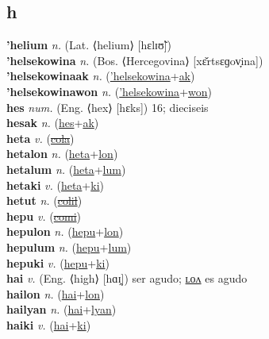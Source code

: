 \subsection{h}

\textbf{'helium} \textit{n.} (Lat. ⟨helium⟩ [hɛlɪʊ̃])
 \label{'helium} \\
\textbf{'helsekowina} \textit{n.} (Bos. ⟨Hercegovina⟩ [xɛ̌rtsɛɡov̞ina])
 \label{'helsekowina} \\
\textbf{'helsekowinaak} \textit{n.} (\hyperref['helsekowina]{'helsekowina}+\hyperref[ak]{ak})
 \label{'helsekowinaak} \\
\textbf{'helsekowinawon} \textit{n.} (\hyperref['helsekowina]{'helsekowina}+\hyperref[won]{won})
 \label{'helsekowinawon} \\
\textbf{hes} \textit{num.} (Eng. ⟨hex⟩ [hɛks])
16; dieciseis \label{hes} \\
\textbf{hesak} \textit{n.} (\hyperref[hes]{hes}+\hyperref[ak]{ak})
 \label{hesak} \\
\textbf{heta} \textit{v.} (\hyperref[cola]{\sout{cola}})
 \label{heta} \\
\textbf{hetalon} \textit{n.} (\hyperref[heta]{heta}+\hyperref[lon]{lon})
 \label{hetalon} \\
\textbf{hetalum} \textit{n.} (\hyperref[heta]{heta}+\hyperref[lum]{lum})
 \label{hetalum} \\
\textbf{hetaki} \textit{v.} (\hyperref[heta]{heta}+\hyperref[ki]{ki})
 \label{hetaki} \\
\textbf{hetut} \textit{n.} (\hyperref[colil]{\sout{colil}})
 \label{hetut} \\
\textbf{hepu} \textit{v.} (\hyperref[comi]{\sout{comi}})
 \label{hepu} \\
\textbf{hepulon} \textit{n.} (\hyperref[hepu]{hepu}+\hyperref[lon]{lon})
 \label{hepulon} \\
\textbf{hepulum} \textit{n.} (\hyperref[hepu]{hepu}+\hyperref[lum]{lum})
 \label{hepulum} \\
\textbf{hepuki} \textit{v.} (\hyperref[hepu]{hepu}+\hyperref[ki]{ki})
 \label{hepuki} \\
\textbf{hai} \textit{v.} (Eng. ⟨high⟩ [hɑɪ̯])
ser agudo; \hyperref[hailon]{ʟᴏᴧ} es agudo \label{hai} \\
\textbf{hailon} \textit{n.} (\hyperref[hai]{hai}+\hyperref[lon]{lon})
 \label{hailon} \\
\textbf{hailyan} \textit{n.} (\hyperref[hai]{hai}+\hyperref[lyan]{lyan})
 \label{hailyan} \\
\textbf{haiki} \textit{v.} (\hyperref[hai]{hai}+\hyperref[ki]{ki})
